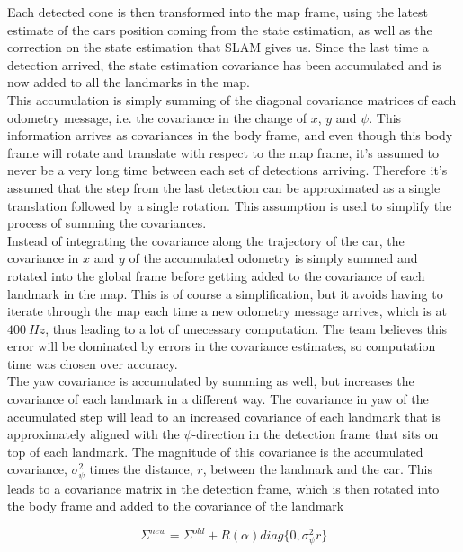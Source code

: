 Each detected cone is then transformed into the map frame, using the latest estimate of the cars position coming from the state estimation, as well as the correction on the state estimation that SLAM gives us. Since the last time a detection arrived, the state estimation covariance has been accumulated and is now added to all the landmarks in the map. \\

This accumulation is simply summing of the diagonal covariance matrices of each odometry message, i.e. the covariance in the change of $x$, $y$ and $\psi$. This information arrives as covariances in the body frame, and even though this body frame will rotate and translate with respect to the map frame, it's assumed to never be a very long time between each set of detections arriving. Therefore it's assumed that the step from the last detection can be approximated as a single translation followed by a single rotation. This assumption is used to simplify the process of summing the covariances. \\

Instead of integrating the covariance along the trajectory of the car, the covariance in $x$ and $y$ of the accumulated odometry is simply summed and rotated into the global frame before getting added to the covariance of each landmark in the map. This is of course a simplification, but it avoids having to iterate through the map each time a new odometry message arrives, which is at $\SI{400}{Hz}$, thus leading to a lot of unecessary computation. The team believes this error will be dominated by errors in the covariance estimates, so computation time was chosen over accuracy. \\ 

The yaw covariance is accumulated by summing as well, but increases the covariance of each landmark in a different way. The covariance in yaw of the accumulated step will lead to an increased covariance of each landmark that is approximately aligned with the $\psi$-direction in the detection frame that sits on top of each landmark. The magnitude of this covariance is the accumulated covariance, $\sigma_{\psi}^2$ times the distance, $r$, between the landmark and the car. This leads to a covariance matrix in the detection frame, which is then rotated into the body frame and added to the covariance of the landmark

\begin{equation}
    \Sigma^{new} = \Sigma^{old} + R(\alpha)diag\{0,\sigma^2_{\psi}r\}
\end{equation}

